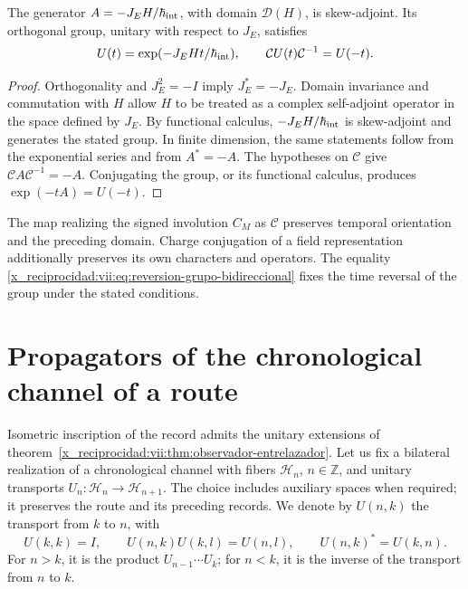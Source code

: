 \begin{theorem}
\label{x_reciprocidad:vii:thm:reversion-evolucion}
The generator \(A=-J_EH/\hbar_{\rm int}\), with domain \(\mathcal D(H)\),
is skew-adjoint. Its orthogonal group, unitary with respect to \(J_E\), satisfies
\begin{equation}
 U(t)=\exp(-J_EHt/\hbar_{\rm int}),\qquad
 \mathcal C U(t)\mathcal C^{-1}=U(-t).
 \label{x_reciprocidad:vii:eq:reversion-grupo-bidireccional}
\end{equation}
\end{theorem}
\begin{proof}
Orthogonality and \(J_E^2=-I\) imply \(J_E^*=-J_E\).
Domain invariance and commutation with \(H\) allow
\(H\) to be treated as a complex self-adjoint operator in the space defined by
\(J_E\). By functional calculus, \(-J_EH/\hbar_{\rm int}\) is
skew-adjoint and generates the stated group. In finite dimension, the same
statements follow from the exponential series and from \(A^*=-A\).
The hypotheses on \(\mathcal C\) give
\(\mathcal C A\mathcal C^{-1}=-A\). Conjugating the group, or its functional
calculus, produces \(\exp(-tA)=U(-t)\).
\end{proof}

The map realizing the signed involution \(C_M\) as \(\mathcal C\)
preserves temporal orientation and the preceding domain. Charge conjugation of
a field representation additionally preserves its own
characters and operators. The equality
\eqref{x_reciprocidad:vii:eq:reversion-grupo-bidireccional} fixes the time reversal
of the group under the stated conditions.

\section{Propagators of the chronological channel of a route}
\label{x_reciprocidad:vii:subsec:green-cronologico}

Isometric inscription of the record admits the unitary extensions
of theorem~\ref{x_reciprocidad:vii:thm:observador-entrelazador}. Let us fix a bilateral
realization of a chronological channel with fibers \(\mathcal H_n\),
\(n\in\mathbb Z\), and unitary transports
\(U_n:\mathcal H_n\to\mathcal H_{n+1}\).
The choice includes auxiliary spaces when required; it preserves
the route and its preceding records. We denote by \(U(n,k)\) the transport
from \(k\) to \(n\), with
\[
 U(k,k)=I,\qquad U(n,k)U(k,l)=U(n,l),\qquad
 U(n,k)^*=U(k,n).
\]
For \(n>k\), it is the product \(U_{n-1}\cdots U_k\); for \(n<k\),
it is the inverse of the transport from \(n\) to \(k\).

